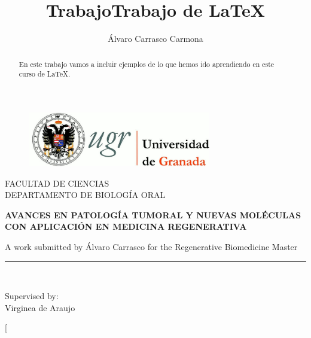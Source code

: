 \documentclass[a4paper,openright,12pt]{report}
\author{Álvaro Carrasco Carmona}
\title{Trabajo}
\begin{document}
\begin{titlepage}

\begin{center}
\vspace*{-1in}
\begin{figure}[htb]
\begin{center}
\includegraphics[width=8cm]{logo_ugr}
\end{center}
\end{figure}

FACULTAD DE CIENCIAS\\
\vspace*{0.15in}
DEPARTAMENTO DE BIOLOGÍA ORAL \\
\vspace*{0.6in}
\begin{large}
\textbf{AVANCES EN PATOLOGÍA TUMORAL Y NUEVAS
MOLÉCULAS CON APLICACIÓN EN MEDICINA REGENERATIVA} \\
\end{large}
\vspace*{0.2in}
\begin{Large}

\end{Large}
\vspace*{0.3in}
\begin{large}
A work submitted by Álvaro Carrasco for the Regenerative Biomedicine Master \\
\end{large}
\vspace*{0.3in}
\rule{80mm}{0.1mm}\\
\vspace*{0.1in}
\begin{large}
Supervised by: \\
Virginea de Araujo \\
\end{large}
\end{center}

\end{titlepage}
\title{Trabajo de LaTeX}
\maketitle
\twocolumn[
\begin{@twocolumnfalse}
\begin{abstract}

En este trabajo vamos a incluir ejemplos de lo que hemos ido aprendiendo en este curso de LaTeX.

\end{abstract}

\end{@twocolumnfalse}
\end{document}
